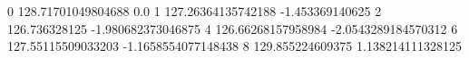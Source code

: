 0 128.71701049804688 0.0
1 127.26364135742188 -1.453369140625
2 126.736328125 -1.980682373046875
4 126.66268157958984 -2.0543289184570312
6 127.55115509033203 -1.1658554077148438
8 129.855224609375 1.138214111328125

